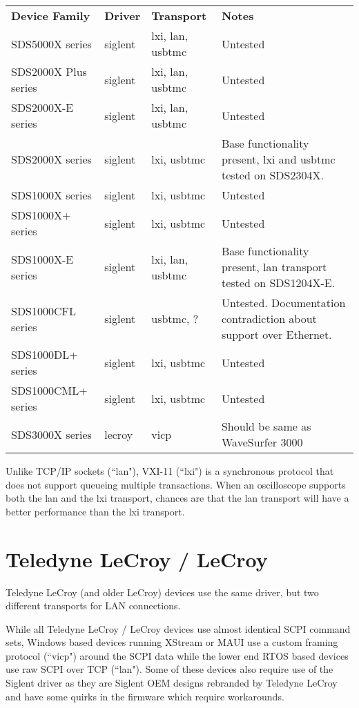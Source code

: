 \begin{tabularx}{16cm}{lllX}
\thickhline
\textbf{Device Family} & \textbf{Driver} & \textbf{Transport} & \textbf{Notes} \\
\thickhline
SDS5000X series & siglent & lxi, lan, usbtmc & Untested \\
\thickhline
SDS2000X Plus series & siglent & lxi, lan, usbtmc & Untested \\
\thickhline
SDS2000X-E series & siglent & lxi, lan, usbtmc & Untested \\
\thickhline
SDS2000X series & siglent & lxi, usbtmc & Base functionality present, lxi and usbtmc tested on SDS2304X. \\
\thickhline
SDS1000X series & siglent & lxi, usbtmc & Untested \\
\thickhline
SDS1000X+ series & siglent & lxi, usbtmc & Untested \\
\thickhline
SDS1000X-E series & siglent & lxi, lan, usbtmc & Base functionality present, lan transport tested on SDS1204X-E.\\
\thickhline
SDS1000CFL series & siglent & usbtmc, ? & Untested. Documentation contradiction about support over Ethernet. \\
\thickhline
SDS1000DL+ series & siglent & lxi, usbtmc & Untested \\
\thickhline
SDS1000CML+ series & siglent & lxi, usbtmc & Untested \\
\thickhline
SDS3000X series & lecroy & vicp & Should be same as WaveSurfer 3000 \\
\end{tabularx}


Unlike TCP/IP sockets (``lan"), VXI-11 (``lxi") is a synchronous protocol that  does not support
queueing multiple transactions. When an oscilloscope supports both the lan and the lxi transport,
chances are that the lan transport will have a better performance than the lxi transport.

\section{Teledyne LeCroy / LeCroy}

Teledyne LeCroy (and older LeCroy) devices use the same driver, but two different transports for LAN connections.

While all Teledyne LeCroy / LeCroy devices use almost identical SCPI command sets, Windows based devices running
XStream or MAUI use a custom framing protocol (``vicp") around the SCPI data while the lower end RTOS based devices use
raw SCPI over TCP (``lan"). Some of these devices also require use of the Siglent driver as they are Siglent OEM
designs rebranded by Teledyne LeCroy and have some quirks in the firmware which require workarounds.

